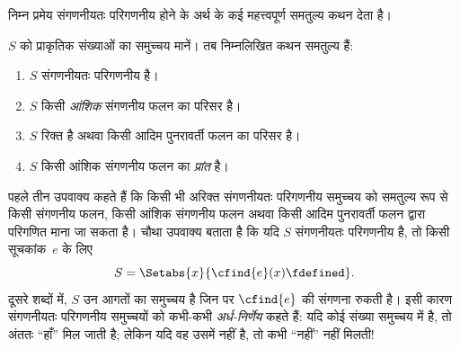 \documentclass[../../../include/open-logic-section]{subfiles}
\begin{document}



निम्न प्रमेय संगणनीयतः परिगणनीय होने के अर्थ के कई महत्त्वपूर्ण समतुल्य
कथन देता है।

\begin{thm}
$S$ को प्राकृतिक संख्याओं का समुच्चय मानें। तब निम्नलिखित कथन समतुल्य हैं:
\begin{enumerate}
\item{} $S$ संगणनीयतः परिगणनीय है।
\item{} $S$ किसी \emph{आंशिक} संगणनीय फलन का परिसर है।
\item{} $S$ रिक्त है अथवा किसी आदिम पुनरावर्ती फलन का परिसर है।
\item{} $S$ किसी आंशिक संगणनीय फलन का \emph{प्रांत} है।
\end{enumerate}
\end{thm}

\begin{explain}
पहले तीन उपवाक्य कहते हैं कि किसी भी अरिक्त संगणनीयतः परिगणनीय समुच्चय
को समतुल्य रूप से किसी संगणनीय फलन, किसी आंशिक संगणनीय फलन अथवा किसी
आदिम पुनरावर्ती फलन द्वारा परिगणित माना जा सकता है। चौथा उपवाक्य बताता
है कि यदि $S$ संगणनीयतः परिगणनीय है, तो किसी सूचकांक~$e$ के लिए
\[
S = \Setabs{x}{\cfind{e}(x) \fdefined}.
\]
दूसरे शब्दों में, $S$ उन आगतों का समुच्चय है जिन पर $\cfind{e}$ की
संगणना रुकती है। इसी कारण संगणनीयतः परिगणनीय समुच्चयों को कभी-कभी
\emph{अर्ध-निर्णेय} कहते हैं: यदि कोई संख्या समुच्चय में है, तो अंततः
``हाँ'' मिल जाती है; लेकिन यदि वह उसमें नहीं है, तो कभी ``नहीं'' नहीं मिलती!{}
\end{explain}
\end{document}
